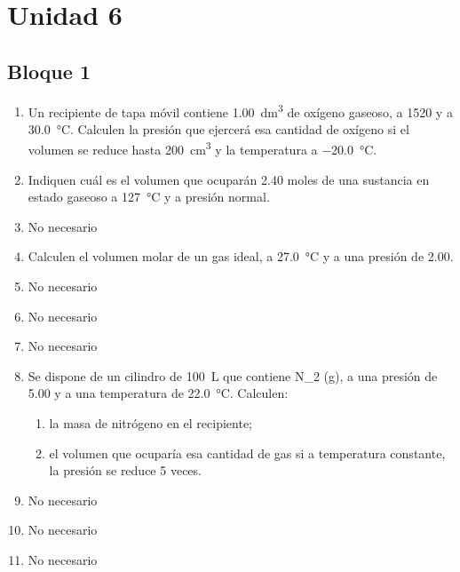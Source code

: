 \documentclass[../Práctica.root.tex]{subfiles}
\begin{document}
\section{Unidad 6}
\subsection{Bloque 1}
\begin{enumerate}
    \item Un recipiente de tapa móvil contiene \SI{1,00}{\deci\m\cubed} de oxígeno gaseoso, a \SI{1520}{\torr} y a
          \SI{30,0}{\celsius}. Calculen la presión que ejercerá esa cantidad de oxígeno si el volumen se reduce
          hasta \SI{200}{\centi\m\cubed} y la temperatura a \SI{-20,0}{\celsius}.

    \item Indiquen cuál es el volumen que ocuparán \num{2,40} moles de una sustancia en estado gaseoso a
          \SI{127}{\celsius} y a presión normal.

    \item No necesario

    \item Calculen el volumen molar de un gas ideal, a \SI{27,0}{\celsius} y a una presión de \SI{2,00}{\atm}.

    \item No necesario

    \item No necesario

    \item No necesario

    \item Se dispone de un cilindro de \SI{100}{\liter} que contiene N_2 (g), a una presión de \SI{5,00}{\atm} y a una
          temperatura de \SI{22,0}{\celsius}. Calculen:
          \begin{enumerate}
              \item la masa de nitrógeno en el recipiente;
              \item el volumen que ocuparía esa cantidad de gas si a temperatura constante, la presión se
                    reduce \num{5} veces.
          \end{enumerate}

    \item No necesario

    \item No necesario

    \item No necesario


\end{enumerate}
\end{document}
